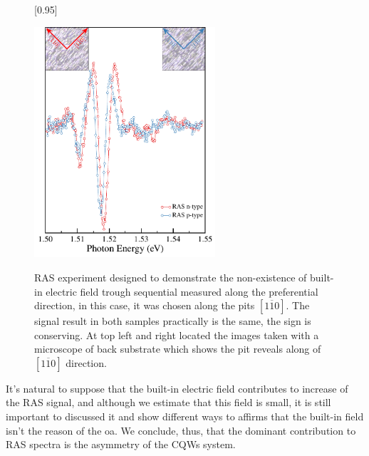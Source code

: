 \begin{figure}[H]
	[0.95\FBwidth]
	{ \caption{RAS experiment designed to demonstrate the non-existence of built-in electric field trough sequential measured along the preferential direction, in this case, it was chosen  along the pits $[1\overline{1}0]$\cite{weyher2010defect}. The signal result in both samples practically is the same, the sign is conserving. At top left and right located the images taken with a microscope of back substrate which shows the pit reveals along of $[1\overline{1}0]$ direction. 
	}\label{fig:chapter-3-subsec-ras-orientation}}
	{
	\includegraphics[width=0.6\textwidth]{../figures/chapter-3/ras-plots/out/ras-set-5.pdf}
	}
\end{figure}
It's natural to suppose that the built-in electric field contributes to increase of the \gls{RAS} signal, and although  we estimate that this field is small, it is still important to discussed it and show different ways to affirms that  the built-in field isn't the reason of the \gls{oa}. 
We conclude, thus, that the dominant contribution to \gls{RAS} spectra is the asymmetry of the \gls{CQWs} system. 

